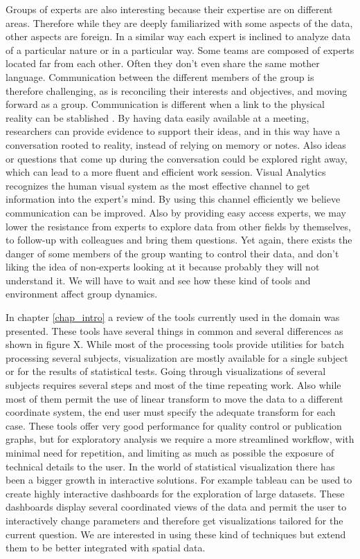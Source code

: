 Groups of experts are also interesting because their expertise are on different areas. Therefore while they are deeply familiarized with some aspects of the data, other aspects are foreign. In a similar way each expert is inclined to analyze data of a particular nature or in a particular way. Some teams are composed of experts located far from each other. Often they don't even share the same mother language. Communication between the different members of the group is therefore challenging, as is reconciling their interests and objectives, and moving forward as a group. Communication is different when a link to the physical reality can be stablished \autocite{rojas_arredondo_dinamica_2010}. By having data easily available at a meeting, researchers can provide evidence to support their ideas, and in this way have a conversation rooted to reality, instead of relying on memory or notes. Also ideas or questions that come up during the conversation could be explored right away, which can lead to a more fluent and efficient work session. Visual Analytics recognizes the human visual system as the most effective channel to get information into the expert's mind. By using this channel efficiently we believe communication can be improved. Also by providing easy access experts, we may lower the resistance from experts to explore data from other fields by themselves, to follow-up with colleagues and bring them questions. Yet again, there exists the danger of some members of the group wanting to control their data, and don't liking the idea of non-experts looking at it because probably they will not understand it. We will have to wait and see how these kind of tools and environment affect group dynamics.


\bigskip

In chapter \ref{chap_intro} a review of the tools currently used in the domain was presented. These tools have several things in common and several differences as shown in figure X. While most of the processing tools provide utilities for batch processing several subjects, visualization are mostly available for a single subject or for the results of statistical tests. Going through visualizations of several subjects requires several steps and most of the time repeating work. Also while most of them permit the use of linear transform to move the data to a different coordinate system, the end user must specify the adequate transform for each case. These tools offer very good performance for quality control or publication graphs, but for exploratory analysis we require a more streamlined workflow, with minimal need for repetition, and limiting as much as possible the exposure of technical details to the user. In the world of statistical visualization there has been a bigger growth in interactive solutions. For example tableau can be used to create highly interactive dashboards for the exploration of large datasets. These dashboards display several coordinated views of the data and permit the user to interactively change parameters and therefore get visualizations tailored for the current question. We are interested in using these kind of techniques but extend them to be better integrated with spatial data. 

